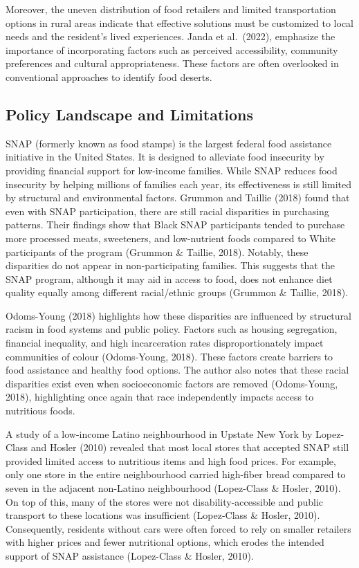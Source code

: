 \documentclass[
]{article}
\begin{document}
Moreover, the uneven distribution of food retailers and limited
transportation options in rural areas indicate that effective solutions
must be customized to local needs and the resident's lived experiences.
Janda et al.~(2022), emphasize the importance of incorporating factors
such as perceived accessibility, community preferences and cultural
appropriateness. These factors are often overlooked in conventional
approaches to identify food deserts.

\subsection{Policy Landscape and
Limitations}\label{policy-landscape-and-limitations}

SNAP (formerly known as food stamps) is the largest federal food
assistance initiative in the United States. It is designed to alleviate
food insecurity by providing financial support for low-income families.
While SNAP reduces food insecurity by helping millions of families each
year, its effectiveness is still limited by structural and environmental
factors. Grummon and Taillie (2018) found that even with SNAP
participation, there are still racial disparities in purchasing
patterns. Their findings show that Black SNAP participants tended to
purchase more processed meats, sweeteners, and low-nutrient foods
compared to White participants of the program (Grummon \& Taillie,
2018). Notably, these disparities do not appear in non-participating
families. This suggests that the SNAP program, although it may aid in
access to food, does not enhance diet quality equally among different
racial/ethnic groups (Grummon \& Taillie, 2018).

Odoms-Young (2018) highlights how these disparities are influenced by
structural racism in food systems and public policy. Factors such as
housing segregation, financial inequality, and high incarceration rates
disproportionately impact communities of colour (Odoms-Young, 2018).
These factors create barriers to food assistance and healthy food
options. The author also notes that these racial disparities exist even
when socioeconomic factors are removed (Odoms-Young, 2018), highlighting
once again that race independently impacts access to nutritious foods.

A study of a low-income Latino neighbourhood in Upstate New York by
Lopez-Class and Hosler (2010) revealed that most local stores that
accepted SNAP still provided limited access to nutritious items and high
food prices. For example, only one store in the entire neighbourhood
carried high-fiber bread compared to seven in the adjacent non-Latino
neighbourhood (Lopez-Class \& Hosler, 2010). On top of this, many of the
stores were not disability-accessible and public transport to these
locations was insufficient (Lopez-Class \& Hosler, 2010). Consequently,
residents without cars were often forced to rely on smaller retailers
with higher prices and fewer nutritional options, which erodes the
intended support of SNAP assistance (Lopez-Class \& Hosler, 2010).
\end{document}
